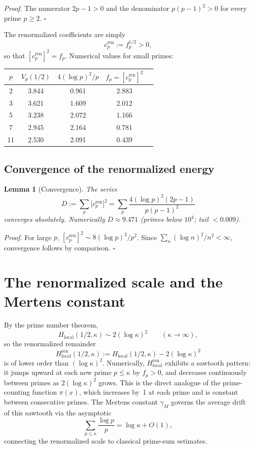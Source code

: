 \documentclass[11pt]{article}
\newtheorem*{lemma*}{Lemma}
\begin{document}
\textit{Proof.}
The numerator $2p-1>0$ and the denominator $p(p-1)^2>0$
for every prime $p\ge 2$. \hfill$\square$

The renormalized coefficients are simply
\begin{equation}\label{eq:cren}
c_p^{\mathrm{ren}} := f_p^{1/2} > 0,
\end{equation}
so that $[c_p^{\mathrm{ren}}]^2 = f_p$.
Numerical values for small primes:

\begin{center}
\begin{tabular}{ccccc}
\toprule
$p$ & $V_p(1/2)$ & $4(\log p)^2/p$ & $f_p = [c_p^{\mathrm{ren}}]^2$ \\
\midrule
2  & 3.844 & 0.961 & 2.883 \\
3  & 3.621 & 1.609 & 2.012 \\
5  & 3.238 & 2.072 & 1.166 \\
7  & 2.945 & 2.164 & 0.781 \\
11 & 2.530 & 2.091 & 0.439 \\
\bottomrule
\end{tabular}
\end{center}

\subsection{Convergence of the renormalized energy}

\begin{lemma*}[Convergence]
The series
\begin{equation}\label{eq:D}
D := \sum_p \bigl[c_p^{\mathrm{ren}}\bigr]^2
   = \sum_p \frac{4(\log p)^2(2p-1)}{p(p-1)^2}
\end{equation}
converges absolutely. Numerically $D \approx 9.471$
(primes below $10^4$; tail $<0.009$).
\end{lemma*}

\textit{Proof.}
For large $p$, $[c_p^{\mathrm{ren}}]^2 \sim 8(\log p)^2/p^2$.
Since $\sum_n (\log n)^2/n^2 <\infty$, convergence follows
by comparison. \hfill$\square$

\section{The renormalized scale and the Mertens constant}

By the prime number theorem,
\[
H_{\mathrm{local}}(1/2,\kappa)
\sim 2(\log\kappa)^2
\qquad(\kappa\to\infty),
\]
so the renormalized remainder
\[
H_{\mathrm{local}}^{\mathrm{ren}}(1/2,\kappa)
:= H_{\mathrm{local}}(1/2,\kappa) - 2(\log\kappa)^2
\]
is of lower order than $(\log\kappa)^2$.
Numerically, $H_{\mathrm{local}}^{\mathrm{ren}}$ exhibits
a sawtooth pattern: it jumps upward at each new prime $p\le\kappa$
by $f_p > 0$, and decreases continuously between primes as
$2(\log\kappa)^2$ grows. This is the direct analogue of
the prime-counting function $\pi(x)$, which increases by~1
at each prime and is constant between consecutive primes.
The Mertens constant $\gamma_M$ governs the average drift
of this sawtooth via the asymptotic
\[
\sum_{p\le\kappa}\frac{\log p}{p}
= \log\kappa + O(1),
\]
connecting the renormalized scale to classical prime-sum estimates.
\end{document}
